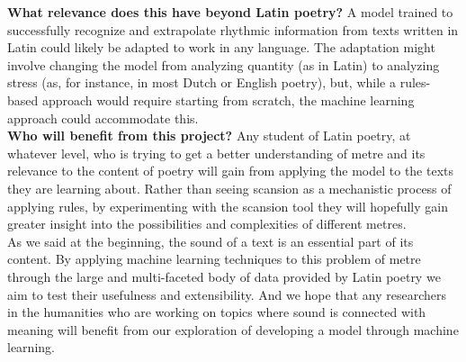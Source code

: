 \textbf{What relevance does this have beyond Latin poetry?}
A model trained to successfully recognize and extrapolate rhythmic information from texts written in Latin could likely be adapted to work in any language. The adaptation might involve changing the model from analyzing quantity (as in Latin) to analyzing stress (as, for instance, in most Dutch or English poetry), but, while a rules-based approach would require starting from scratch, the machine learning approach could accommodate this.\\

\textbf{Who will benefit from this project?}
Any student of Latin poetry, at whatever level, who is trying to get a better understanding of metre and its relevance to the content of poetry will gain from applying the model to the texts they are learning about. Rather than seeing scansion as a mechanistic process of applying rules, by experimenting with the scansion tool they will hopefully gain greater insight into the possibilities and complexities of different metres.\\

As we said at the beginning, the sound of a text is an essential part of its content. By applying machine learning techniques to this problem of metre through the large and multi-faceted body of data provided by Latin poetry we aim to test their usefulness and extensibility. And we hope that any researchers in the humanities who are working on topics where sound is connected with meaning will benefit from our exploration of developing a model through machine learning.\\